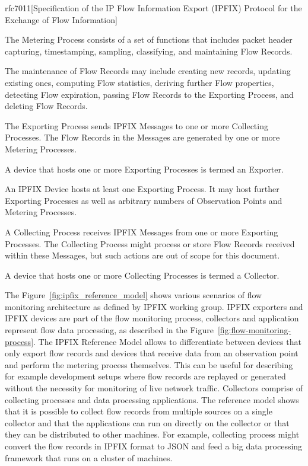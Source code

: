 \begin{displaycquote}{rfc7011}[Specification of the IP Flow Information Export (IPFIX) Protocol for the Exchange of Flow Information]
\begin{description}[style=nextline]
      The Metering Process consists of a set of functions that includes
      packet header capturing, timestamping, sampling, classifying, and
      maintaining Flow Records.

      The maintenance of Flow Records may include creating new records,
      updating existing ones, computing Flow statistics, deriving
      further Flow properties, detecting Flow expiration, passing Flow
      Records to the Exporting Process, and deleting Flow Records.
      
		\item[Exporting Process]
      The Exporting Process sends IPFIX Messages to one or more
      Collecting Processes.  The Flow Records in the Messages are
      generated by one or more Metering Processes.

		\item[Exporter]
      A device that hosts one or more Exporting Processes is termed an
      Exporter.

		\item[IPFIX Device]
      An IPFIX Device hosts at least one Exporting Process.  It may host
      further Exporting Processes as well as arbitrary numbers of
      Observation Points and Metering Processes.

		\item[Collecting Process]
      A Collecting Process receives IPFIX Messages from one or more
      Exporting Processes.  The Collecting Process might process or
      store Flow Records received within these Messages, but such
      actions are out of scope for this document.

		\item[Collector]
      A device that hosts one or more Collecting Processes is termed a
      Collector.
    \end{description}

\end{displaycquote}


The Figure~\ref{fig:ipfix_reference_model} shows various scenarios of flow monitoring architecture as defined by IPFIX working group. IPFIX exporters and IPFIX devices are part of the flow monitoring process, collectors and application represent flow data processing, as described in the Figure~\ref{fig:flow-monitoring-process}. The IPFIX Reference Model allows to differentiate between devices that only export flow records and devices that receive data from an observation point and perform the metering process themselves. This can be useful for describing for example development setups where flow records are replayed or generated without the necessity for monitoring of live network traffic. Collectors comprise of collecting processes and data processing applications. The reference model shows that it is possible to collect flow records from multiple sources on a single collector and that the applications can run on directly on the collector or that they can be distributed to other machines. For example, collecting process might convert the flow records in IPFIX format to JSON and feed a big data processing framework that runs on a cluster of machines.


